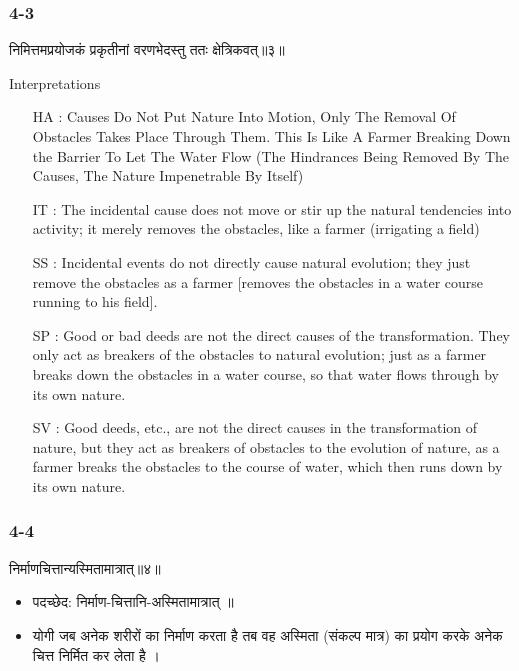 \begin{frame}[fragile]\frametitle{4-3}
\begin{sanskrit}
निमित्तमप्रयोजकं प्रकृतीनां वरणभेदस्तु ततः क्षेत्रिकवत्॥३॥
\end{sanskrit}

Interpretations
\begin{itemize}	
\item [HA]: Causes Do Not Put Nature Into Motion, Only The Removal Of Obstacles Takes Place Through Them. This Is Like A Farmer Breaking Down the Barrier To Let The Water Flow (The Hindrances Being Removed By The Causes, The Nature Impenetrable By Itself)
\item [IT]: The incidental cause does not move or stir up the natural tendencies into activity; it merely removes the obstacles, like a farmer (irrigating a field)
\item [SS]: Incidental events do not directly cause natural evolution; they just remove the obstacles as a farmer [removes the obstacles in a water course running to his field].
\item [SP]: Good or bad deeds are not the direct causes of the transformation. They only act as breakers of the obstacles to natural evolution; just as a farmer breaks down the obstacles in a water course, so that water flows through by its own nature.
\item [SV]: Good deeds, etc., are not the direct causes in the transformation of nature, but they act as breakers of obstacles to the evolution of nature, as a farmer breaks the obstacles to the course of water, which then runs down by its own nature.
\end{itemize}
\end{frame}

\begin{frame}[fragile]\frametitle{4-4}
\begin{sanskrit}
निर्माणचित्तान्यस्मितामात्रात्॥४॥
\end{sanskrit}

\begin{itemize}
\item पदच्छेद:  ‌निर्माण-चित्तानि-अस्मितामात्रात् ॥
\item योगी जब अनेक शरीरों का निर्माण करता है तब वह अस्मिता (संकल्प मात्र) का प्रयोग करके अनेक चित्त निर्मित कर लेता है ।
\end{itemize}
\end{frame}


